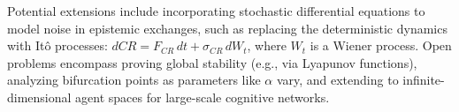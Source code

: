 \begin{remark}
	Potential extensions include incorporating stochastic differential equations to model noise in epistemic exchanges, such as replacing the deterministic dynamics with It\^o processes: \(dCR = F_{CR} \, dt + \sigma_{CR} \, dW_t\), where \(W_t\) is a Wiener process. Open problems encompass proving global stability (e.g., via Lyapunov functions), analyzing bifurcation points as parameters like \(\alpha\) vary, and extending to infinite-dimensional agent spaces for large-scale cognitive networks.
\end{remark}